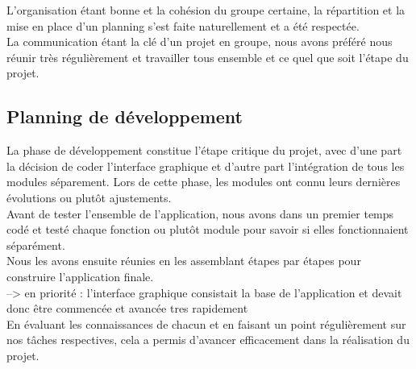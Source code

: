 \documentclass[a4]{article}
\begin{document}
		L'organisation étant bonne et la cohésion du groupe certaine, la répartition et la mise en place d'un planning 
		s'est faite naturellement et a été respectée.  \\
		La communication étant la clé d'un projet en groupe, nous avons préféré
		nous réunir très régulièrement et travailler tous ensemble et ce quel que soit l'étape du projet.
		\subsection{Planning de développement}
		La phase de développement constitue l’étape critique du projet, avec d’une part la décision de coder l’interface graphique
et d’autre part l’intégration de tous les modules séparement. Lors de cette phase, les modules ont connu leurs dernières évolutions ou plutôt ajustements. \\
Avant de tester l’ensemble de l’application, nous avons dans un premier temps codé et
testé chaque fonction ou plutôt module pour savoir si elles fonctionnaient séparément. \\
Nous les avons ensuite
réunies en les assemblant étapes par étapes pour construire l’application finale.  \\
--> en priorité : l'interface graphique consistait la base de l'application et devait donc être commencée et avancée tres rapidement \\
En évaluant les connaissances de chacun et en faisant un point régulièrement sur nos tâches respectives, cela a permis 
d'avancer efficacement dans la réalisation du projet.
\end{document}
